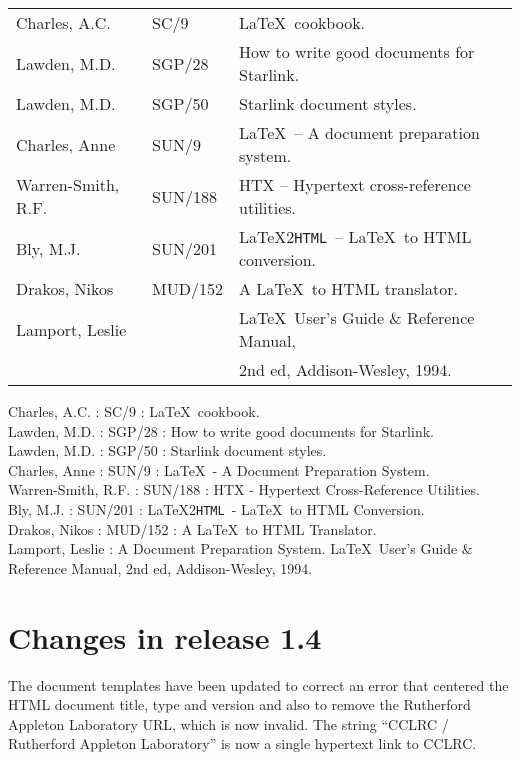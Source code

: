 \documentclass[twoside,11pt]{article}
\newenvironment{latexonly}{}{}
\newcommand{\xref}[3]{#1}
\newcommand{\xlabel}[1]{}
\newcommand{\latextohtml}{\LaTeX2\texttt{HTML}}
\renewcommand{\_}{\texttt{\symbol{95}}}
\begin{document}
\begin{latexonly}
\begin {tabular}{lll}
Charles, A.C. & \xref{SC/9}{sc9}{}
 & \LaTeX\ cookbook.\\
Lawden, M.D. & \xref{SGP/28}{sgp28}{}
 & How to write good documents for Starlink.\\
Lawden, M.D. & \xref{SGP/50}{sgp50}{}
 & Starlink document styles.\\
Charles, Anne & \xref{SUN/9}{sun9}{}
 & \LaTeX\ -- A document preparation system.\\
Warren-Smith, R.F. & \xref{SUN/188}{sun188}{}
 & HTX -- Hypertext cross-reference utilities.\\
Bly, M.J. & \xref{SUN/201}{sun201}{}
 & \latextohtml\ -- \LaTeX\ to HTML conversion.\\
Drakos, Nikos & MUD/152
 & A \LaTeX\ to HTML translator.\\
Lamport, Leslie & & \LaTeX\ User's Guide \& Reference Manual,\\
 & & 2nd ed, Addison-Wesley, 1994.\\
\end {tabular}
\end{latexonly}

\begin{htmlonly}
Charles, A.C. : \xref{SC/9}{sc9}{} :
 \LaTeX\ cookbook.\\
Lawden, M.D. : \xref{SGP/28}{sgp28}{} :
 How to write good documents for Starlink.\\
Lawden, M.D. : \xref{SGP/50}{sgp50}{} :
 Starlink document styles.\\
Charles, Anne : \xref{SUN/9}{sun9}{} :
 \LaTeX\ - A Document Preparation System.\\
Warren-Smith, R.F. : \xref{SUN/188}{sun188}{} :
 HTX - Hypertext Cross-Reference Utilities.\\
Bly, M.J. : \xref{SUN/201}{sun201}{} :
\latextohtml\ - \LaTeX\ to HTML Conversion.\\
Drakos, Nikos : MUD/152 :
 A \LaTeX\ to HTML Translator.\\
Lamport, Leslie : A Document Preparation System.
 \LaTeX\ User's Guide \& Reference Manual, 2nd ed, Addison-Wesley, 1994.
\end{htmlonly}

\newpage
\appendix
\section{\xlabel{changes_in_this_release}\label{changes}Changes in release 1.4}
The document templates have been updated to correct an error that centered
the HTML document title, type and version and also to remove the Rutherford
Appleton Laboratory URL, which is now invalid. The string ``CCLRC /
Rutherford Appleton Laboratory'' is now a single hypertext link to CCLRC.
\end{document}
